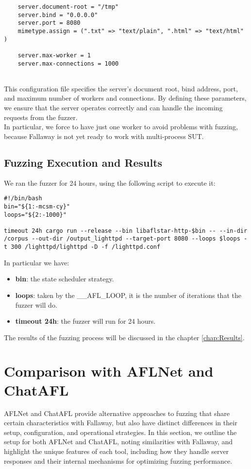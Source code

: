 \begin{lstlisting}
    server.document-root = "/tmp"
    server.bind = "0.0.0.0"
    server.port = 8080
    mimetype.assign = (".txt" => "text/plain", ".html" => "text/html" )

    server.max-worker = 1 
    server.max-connections = 1000
\end{lstlisting}
\phantom{}\\
This configuration file specifies the server's document root, bind address, port, and maximum number of workers and connections. By defining these parameters, we ensure that the server operates correctly and can handle the incoming requests from the fuzzer.
\\In particular, we force to have just one worker to avoid problems with fuzzing, because Fallaway is not yet ready to work with multi-process SUT.
\subsection{Fuzzing Execution and Results}

We ran the fuzzer for 24 hours, using the following script to execute it:

\begin{lstlisting}
#!/bin/bash
bin="${1:-mcsm-cy}"
loops="${2:-1000}"

timeout 24h cargo run --release --bin libaflstar-http-$bin -- --in-dir /corpus --out-dir /output_lighttpd --target-port 8080 --loops $loops -t 300 /lighttpd/lighttpd -D -f /lighttpd.conf
\end{lstlisting}
In particular we have:
\begin{itemize}
    \item \textbf{bin}: the state scheduler strategy.
    \item \textbf{loops}: taken by the \_\_AFL\_LOOP, it is the number of iterations that the fuzzer will do.
    \item \textbf{timeout 24h}: the fuzzer will run for 24 hours.
\end{itemize}
The results of the fuzzing process will be discussed in the chapter \ref{chap:Results}.

\section{Comparison with AFLNet and ChatAFL}

AFLNet and ChatAFL provide alternative approaches to fuzzing that share certain characteristics with Fallaway, but also have distinct differences in their setup, configuration, and operational strategies. In this section, we outline the setup for both AFLNet and ChatAFL, noting similarities with Fallaway, and highlight the unique features of each tool, including how they handle server responses and their internal mechanisms for optimizing fuzzing performance.

